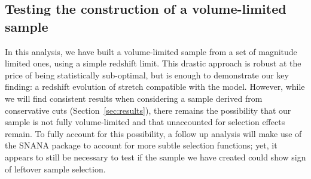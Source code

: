 \documentclass[]{aa}
\newcommand{\nn}[1]{\textcolor[rgb]{0.4, 0.8, 0}{#1}}
\begin{document}
\subsection{Testing the construction of a volume-limited sample}\label{ssec:verify}

In this analysis, we have built a volume-limited sample from a set of magnitude
limited ones, using a simple redshift limit. \nn{This drastic approach is robust
at the price of being statistically sub-optimal, but is enough to
demonstrate our key finding: a redshift evolution of stretch compatible with
the \cite{rigault2018} model.} However, while we will find consistent results
when considering a sample derived from conservative cuts
(Section~\ref{sec:results}), there remains the possibility that our sample is
not fully volume-limited and that unaccounted for selection effects remain. To
fully account for this possibility, a follow up analysis will make use of the
SNANA package \citep{SNANA} to account for more subtle selection functions;
\nn{yet, it appears to still be necessary} to test if the sample we have created
could show sign of leftover sample selection.
\end{document}
